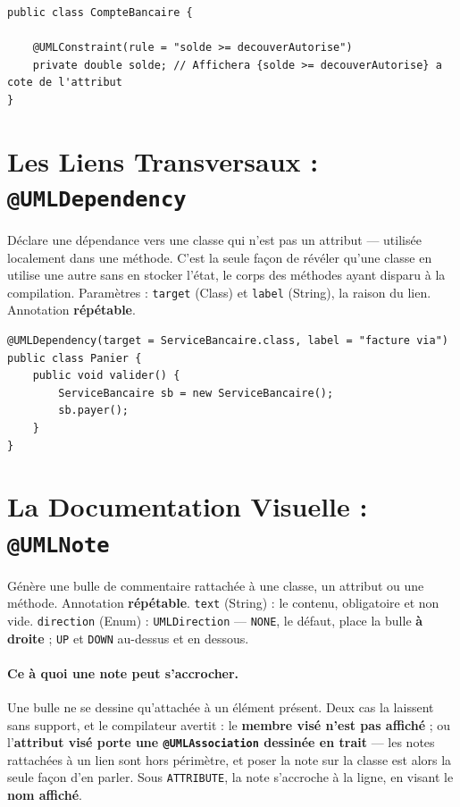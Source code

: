 \documentclass[12pt, a4paper]{article}
\begin{document}
\begin{lstlisting}
public class CompteBancaire {

    @UMLConstraint(rule = "solde >= decouverAutorise")
    private double solde; // Affichera {solde >= decouverAutorise} a cote de l'attribut
}
\end{lstlisting}

\section{Les Liens Transversaux : \texttt{@UMLDependency}}

Déclare une dépendance vers une classe qui n'est pas un attribut --- utilisée localement dans une méthode. C'est la seule façon de révéler qu'une classe en utilise une autre sans en stocker l'état, le corps des méthodes ayant disparu à la compilation. Paramètres : \texttt{target} (Class) et \texttt{label} (String), la raison du lien. Annotation \textbf{répétable}.

\begin{lstlisting}
@UMLDependency(target = ServiceBancaire.class, label = "facture via")
public class Panier {
    public void valider() {
        ServiceBancaire sb = new ServiceBancaire();
        sb.payer();
    }
}
\end{lstlisting}

\section{La Documentation Visuelle : \texttt{@UMLNote}}

Génère une bulle de commentaire rattachée à une classe, un attribut ou une méthode. Annotation \textbf{répétable}. \texttt{text} (String) : le contenu, obligatoire et non vide. \texttt{direction} (Enum) : \texttt{UMLDirection} --- \texttt{NONE}, le défaut, place la bulle \textbf{à droite} ; \texttt{UP} et \texttt{DOWN} au-dessus et en dessous.

\paragraph{Ce à quoi une note peut s'accrocher.} Une bulle ne se dessine qu'attachée à un élément présent. Deux cas la laissent sans support, et le compilateur avertit : le \textbf{membre visé n'est pas affiché} ; ou l'\textbf{attribut visé porte une \texttt{@UMLAssociation} dessinée en trait} --- les notes rattachées à un lien sont hors périmètre, et poser la note sur la classe est alors la seule façon d'en parler. Sous \texttt{ATTRIBUTE}, la note s'accroche à la ligne, en visant le \textbf{nom affiché}.
\end{document}
